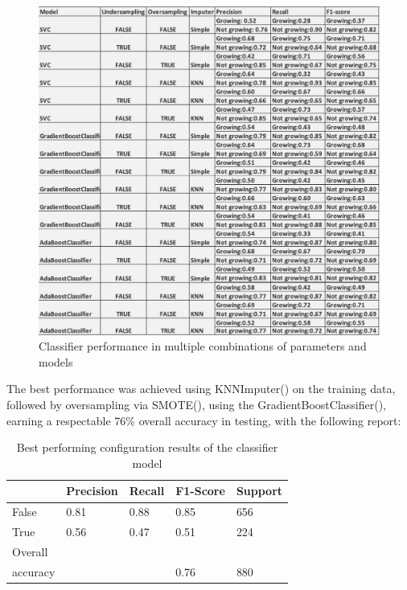 \documentclass[12pt,MSc,a4paper,oneside]{muthesis}
\begin{document}
    \begin{figure}[h]
      \centering
      \includegraphics[scale=0.5]{results/Classifier results.png}
      \caption{Classifier performance in multiple combinations of parameters and models}
    \end{figure}

    The best performance was achieved using KNNImputer(\cite{scikit-learn}) on the training data, followed by oversampling via SMOTE(\cite{JMLR:v18:16-365}), using the GradientBoostClassifier(\cite{scikit-learn}), earning a respectable 76\% overall accuracy in testing, with the following report:

    \begin{table}[h]
      \caption{Best performing configuration results of the classifier model}
      \label{tab:pretrained-models}
      \begin{tabularx}{\textwidth}{|X|X|X|X|X|}
        \toprule
        {}&{Precision}&{Recall}&{F1-Score}&{Support}\\
        \midrule
        False & 0.81 & 0.88 & 0.85 & 656\\\hline

        True & 0.56 & 0.47 & 0.51 & 224\\\hline
        Overall \\ accuracy &  &  & 0.76 & 880\\\hline
        \bottomrule
      \end{tabularx}
    \end{table}
\end{document}
